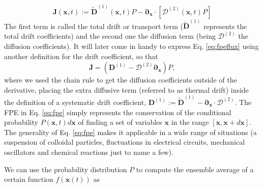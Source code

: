 \documentclass[ twoside,openright,titlepage,numbers=noenddot,%
headinclude,footinclude,cleardoublepage=empty,abstract=on,
BCOR=5mm,paper=b5,fontsize=11pt, dvipsnames
]{scrreprt}
\renewcommand{\vec}[1]{\bm{#1}}
\newcommand{\tens}[1]{\bm{\mathcal{#1}}}
\begin{document}
\begin{equation}
  \label{eq:fpefluxkinetic}
    \vec{J}(\vec{x}, t) := \widetilde{\vec{D}}^{(1)}(\vec{x},t)P - \vec{\partial}_{\vec{x}}\cdot\left[\tens{D}^{(2)}(\vec{x}, t)  P\right]
\end{equation}
The first term is called the total drift or transport term ($\widetilde{\vec{D}}^{(1)}$ represents the total drift coefficients) and the second one the diffusion term (being $\tens{D}^{(2)}$ the diffusion coefficients). It will later come in handy to express Eq. \eqref{eq:fpeflux} using another definition for the drift coefficient, so that
\begin{equation}
  \label{eq:fpeflux}
  \vec{J} = \left(\vec{D}^{(1)} - \tens{D}^{(2)} \vec{\partial}_{\vec{x}}\right) P,
\end{equation}
where we used the chain rule to get the diffusion coefficients outside of the derivative, placing the extra diffusive term (referred to as thermal drift) inside the definition of a systematic drift coefficient, $\vec{D}^{(1)}:=\widetilde{\vec{D}}^{(1)}-\vec{\partial}_{\vec{x}}\cdot\tens{D}^{(2)}$.
%
The \gls{FPE} in Eq. \eqref{eq:fpe} simply represents the conservation of the conditional probability $P(\vec{x},t)d\vec{x}$ of finding a set of variables $\vec{x}$ in the range $[\vec{x}, \vec{x} + d\vec{x}]$. The generality of Eq. \eqref{eq:fpe} makes it applicable in a wide range of situations (a suspension of colloidal particles, fluctuations in electrical circuits, mechanical oscillators and chemical reactions just to name a few).

We can use the probability distribution $P$ to compute the ensemble average of a certain function $f(\vec{x}(t))$ as
\end{document}
